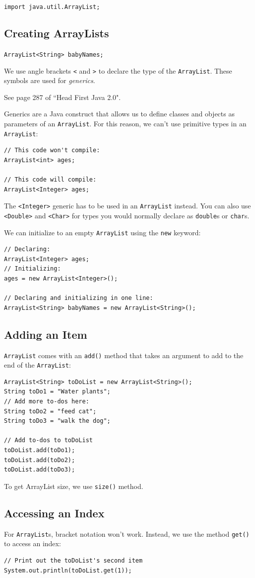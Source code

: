 \documentclass[a4paper, 12pt]{article}
\begin{document}
\verb|import java.util.ArrayList;|

\subsection{Creating ArrayLists}
\verb|ArrayList<String> babyNames;|

We use angle brackets \verb|<| and \verb|>| to declare the type of the \verb|ArrayList|. These symbols are used for \textit{generics}.

See page 287 of ``Head First Java 2.0".

Generics are a Java construct that allows us to define classes and objects as parameters of an \verb|ArrayList|. For this reason, we can't use primitive types in an \verb|ArrayList|:
\begin{verbatim}
// This code won't compile:
ArrayList<int> ages;

// This code will compile:
ArrayList<Integer> ages;
\end{verbatim}
The \verb|<Integer>| generic has to be used in an \verb|ArrayList| instead. You can also use \verb|<Double>| and \verb|<Char>| for types you would normally declare as \verb|double|s or \verb|char|s.

We can initialize to an empty \verb|ArrayList| using the \verb|new| keyword:
\begin{verbatim}
// Declaring:
ArrayList<Integer> ages;
// Initializing:
ages = new ArrayList<Integer>();

// Declaring and initializing in one line:
ArrayList<String> babyNames = new ArrayList<String>();
\end{verbatim}


\subsection{Adding an Item}
\verb|ArrayList| comes with an \verb|add()| method that takes an argument to add to the end of the \verb|ArrayList|:
\begin{verbatim}
ArrayList<String> toDoList = new ArrayList<String>();
String toDo1 = "Water plants";
// Add more to-dos here:
String toDo2 = "feed cat";
String toDo3 = "walk the dog";

// Add to-dos to toDoList
toDoList.add(toDo1);
toDoList.add(toDo2);
toDoList.add(toDo3);
\end{verbatim}

To get ArrayList size, we use \verb|size()| method.

\subsection{Accessing an Index}
For \verb|ArrayList|s, bracket notation won't work. Instead, we use the method \verb|get()| to access an index:
\begin{verbatim}
// Print out the toDoList's second item
System.out.println(toDoList.get(1));
\end{verbatim}
\end{document}
